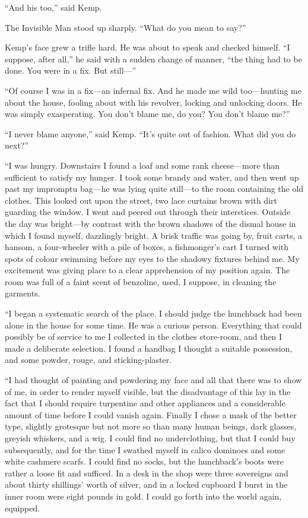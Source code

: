 “And his too,” said Kemp.

The Invisible Man stood up sharply. “What do you mean to say?”

Kemp’s face grew a trifle hard. He was about to speak and checked himself. “I suppose, after all,” he said with a sudden change of manner, “the thing had to be done. You were in a fix. But still—”

“Of course I was in a fix—an infernal fix. And he made me wild too—hunting me about the house, fooling about with his revolver, locking and unlocking doors. He was simply exasperating. You don’t blame me, do you? You don’t blame me?”

“I never blame anyone,” said Kemp. “It’s quite out of fashion. What did you do next?”

{“I was hungry. Downstairs I found a loaf and some rank cheese—more than sufficient to satisfy my hunger. I took some brandy and water, and then went up past my impromptu bag—he was lying quite still—to the room containing the old clothes. This looked out upon the street, two lace curtains brown with dirt guarding the window. I went and peered out through their interstices. Outside the day was bright—by contrast with the brown shadows of the dismal house in which I found myself, dazzlingly bright. A brisk traffic was going by, fruit carts, a hansom, a four-wheeler with a pile of boxes, a fishmonger’s cart I turned with spots of colour swimming before my eyes to the shadowy fixtures behind me. My excitement was giving place to a clear apprehension of my position again. The room was full of a faint scent of benzoline, used, I suppose, in cleaning the garments.}

{“I began a systematic search of the place. I should judge the hunchback had been alone in the house for some time. He was a curious person. Everything that could possibly be of service to me I collected in the clothes store-room, and then I made a deliberate selection. I found a handbag I thought a suitable possession, and some powder, rouge, and sticking-plaster.}

“I had thought of painting and powdering my face and all that there was to show of me, in order to render myself visible, but the disadvantage of this lay in the fact that I should require turpentine and other appliances and a considerable amount of time before I could vanish again. Finally I chose a mask of the better type, slightly grotesque but not more so than many human beings, dark glasses, greyish whiskers, and a wig. I could find no underclothing, but that I could buy subsequently, and for the time I swathed myself in calico dominoes and some white cashmere scarfs. I could find no socks, but the hunchback’s boots were rather a loose fit and sufficed. In a desk in the shop were three sovereigns and about thirty shillings’ worth of silver, and in a locked cupboard I burst in the inner room were eight pounds in gold. I could go forth into the world again, equipped.

